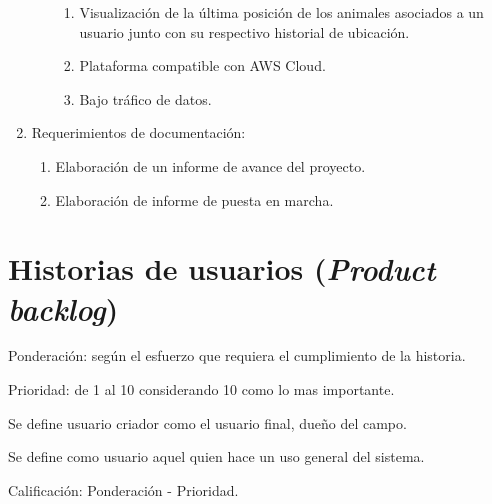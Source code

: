\documentclass[11pt]{charter}
\begin{document}
\begin{enumerate}
\begin{enumerate}
\begin{enumerate}
		\item Visualización de la última posición de los animales asociados a un usuario junto con su respectivo historial de ubicación.
		\item Plataforma compatible con AWS Cloud.
		\item Bajo tráfico de datos.
		\end{enumerate}
	\end{enumerate}
\item Requerimientos de documentación:
	\begin{enumerate}
	\item Elaboración de un informe de avance del proyecto.
	\item Elaboración de informe de puesta en marcha.
	\end{enumerate}	
\end{enumerate}



\section{Historias de usuarios (\textit{Product backlog})}
\label{sec:backlog}

Ponderación: según el esfuerzo que requiera el cumplimiento de la historia.

Prioridad: de 1 al 10 considerando 10 como lo mas importante.

Se define usuario criador como el usuario final, dueño del campo.

Se define como usuario aquel quien hace un uso general del sistema.

Calificación: Ponderación - Prioridad.
\end{document}
